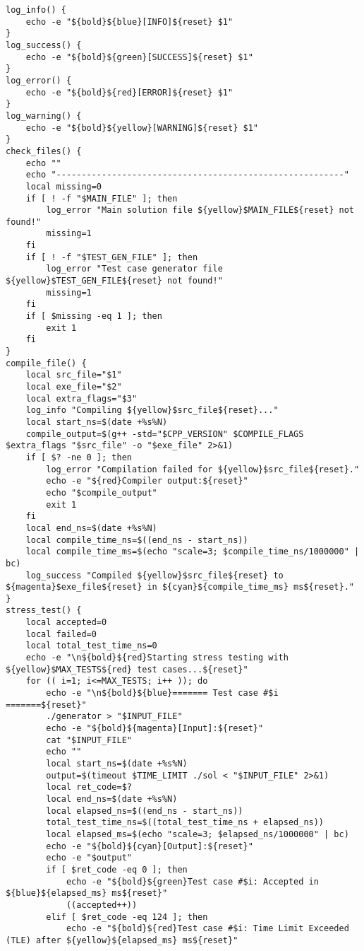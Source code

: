 \begin{lstlisting}[style=bashstyle]
log_info() {
    echo -e "${bold}${blue}[INFO]${reset} $1"
}
log_success() {
    echo -e "${bold}${green}[SUCCESS]${reset} $1"
}
log_error() {
    echo -e "${bold}${red}[ERROR]${reset} $1"
}
log_warning() {
    echo -e "${bold}${yellow}[WARNING]${reset} $1"
}
check_files() {
    echo ""
    echo "---------------------------------------------------------"
    local missing=0
    if [ ! -f "$MAIN_FILE" ]; then
        log_error "Main solution file ${yellow}$MAIN_FILE${reset} not found!"
        missing=1
    fi
    if [ ! -f "$TEST_GEN_FILE" ]; then
        log_error "Test case generator file ${yellow}$TEST_GEN_FILE${reset} not found!"
        missing=1
    fi
    if [ $missing -eq 1 ]; then
        exit 1
    fi
}
compile_file() {
    local src_file="$1"
    local exe_file="$2"
    local extra_flags="$3"
    log_info "Compiling ${yellow}$src_file${reset}..."
    local start_ns=$(date +%s%N)
    compile_output=$(g++ -std="$CPP_VERSION" $COMPILE_FLAGS $extra_flags "$src_file" -o "$exe_file" 2>&1)
    if [ $? -ne 0 ]; then
        log_error "Compilation failed for ${yellow}$src_file${reset}."
        echo -e "${red}Compiler output:${reset}"
        echo "$compile_output"
        exit 1
    fi
    local end_ns=$(date +%s%N)
    local compile_time_ns=$((end_ns - start_ns))
    local compile_time_ms=$(echo "scale=3; $compile_time_ns/1000000" | bc)
    log_success "Compiled ${yellow}$src_file${reset} to ${magenta}$exe_file${reset} in ${cyan}${compile_time_ms} ms${reset}."
}
stress_test() {
    local accepted=0
    local failed=0
    local total_test_time_ns=0
    echo -e "\n${bold}${red}Starting stress testing with ${yellow}$MAX_TESTS${red} test cases...${reset}"
    for (( i=1; i<=MAX_TESTS; i++ )); do
        echo -e "\n${bold}${blue}======= Test case #$i =======${reset}"
        ./generator > "$INPUT_FILE"
        echo -e "${bold}${magenta}[Input]:${reset}"
        cat "$INPUT_FILE"
        echo ""
        local start_ns=$(date +%s%N)
        output=$(timeout $TIME_LIMIT ./sol < "$INPUT_FILE" 2>&1)
        local ret_code=$?
        local end_ns=$(date +%s%N)
        local elapsed_ns=$((end_ns - start_ns))
        total_test_time_ns=$((total_test_time_ns + elapsed_ns))
        local elapsed_ms=$(echo "scale=3; $elapsed_ns/1000000" | bc)
        echo -e "${bold}${cyan}[Output]:${reset}"
        echo -e "$output"
        if [ $ret_code -eq 0 ]; then
            echo -e "${bold}${green}Test case #$i: Accepted in ${blue}${elapsed_ms} ms${reset}"
            ((accepted++))
        elif [ $ret_code -eq 124 ]; then
            echo -e "${bold}${red}Test case #$i: Time Limit Exceeded (TLE) after ${yellow}${elapsed_ms} ms${reset}"

\end{lstlisting}
